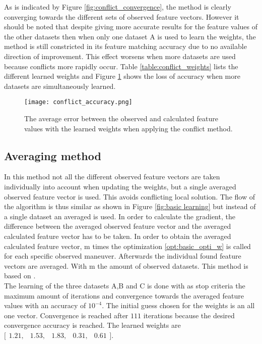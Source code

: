  As is indicated by Figure \ref{fig:conflict_convergence}, the method is clearly converging towards the different sets of observed feature vectors. However it should be noted that despite giving more accurate results for the feature values of the other datasets then when only one dataset A is used to learn the weights, the method is still constricted in its feature matching accuracy due to no available direction of improvement. This effect worsens when more datasets are used because conflicts more rapidly occur. Table \ref{table:conflict_weights} lists the different learned weights and Figure \ref{fig:conflict_accuracy} shows the loss of accuracy when more datasets are simultaneously learned.
 
 

\begin{figure}[h!]
	\centering
	\texttt{[image: conflict\_accuracy.png]}
	\caption{The average error between the observed and calculated feature values with the learned weights when applying the conflict method.}
	\label{fig:conflict_accuracy}
\end{figure}

 \subsection{Averaging method}
 In this method not all the different observed feature vectors are taken individually into account when updating the weights, but a single averaged observed feature vector is used. This avoids conflicting local solution. The flow of the algorithm is thus similar as shown in Figure \ref{fig:basic learning} but instead of a single dataset an averaged is used. In order to calculate the gradient, the difference between the averaged observed feature vector and the averaged calculated feature vector has to be taken. In order to obtain the averaged calculated feature vector, m times the optimization \ref{opt:basic_opti_w} is called for each specific observed maneuver. Afterwards the individual found feature vectors are averaged. With m the amount of observed datasets. This method is based on \cite{Kuderer2015a}.\\
 

 The learning of the three datasets A,B and C is done with as stop criteria the maximum amount of iterations and convergence towards the averaged feature values with an accuracy of $10^{-4}$. The initial guess chosen for the weights is an all one vector. Convergence is reached after $111$ iterations because the desired convergence accuracy is reached. The learned weights are $\bigl[ \begin{smallmatrix} 1.21,&1.53,&1.83,&0.31,&0.61\end{smallmatrix}\bigr]$. 
 

